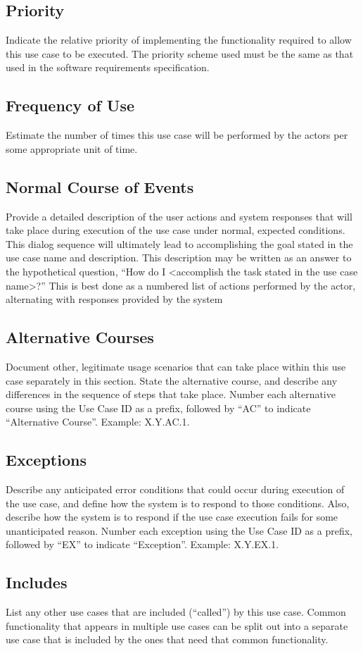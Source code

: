 \documentclass[a4paper]{article}
\begin{document}
\subsection{Priority}
Indicate the relative priority of implementing the functionality required to allow this use case to be executed. The priority scheme used must be the same as that used in the software requirements specification.
\subsection{Frequency of Use}
Estimate the number of times this use case will be performed by the actors per some appropriate unit of time.
\subsection{Normal Course of Events}
Provide a detailed description of the user actions and system responses that will take place during execution of the use case under normal, expected conditions. This dialog sequence will ultimately lead to accomplishing the goal stated in the use case name and description. This description may be written as an answer to the hypothetical question, “How do I <accomplish the task stated in the use case name>?” This is best done as a numbered list of actions performed by the actor, alternating with responses provided by the system
\subsection{Alternative Courses}
Document other, legitimate usage scenarios that can take place within this use case separately in this section. State the alternative course, and describe any differences in the sequence of steps that take place. Number each alternative course using the Use Case ID as a prefix, followed by “AC” to indicate “Alternative Course”. Example:  X.Y.AC.1.
\subsection{Exceptions}
Describe any anticipated error conditions that could occur during execution of the use case, and define how the system is to respond to those conditions. Also, describe how the system is to respond if the use case execution fails for some unanticipated reason. Number each exception using the Use Case ID as a prefix, followed by “EX” to indicate “Exception”. Example:  X.Y.EX.1.
\subsection{Includes}
List any other use cases that are included (“called”) by this use case. Common functionality that appears in multiple use cases can be split out into a separate use case that is included by the ones that need that common functionality.
\end{document}
